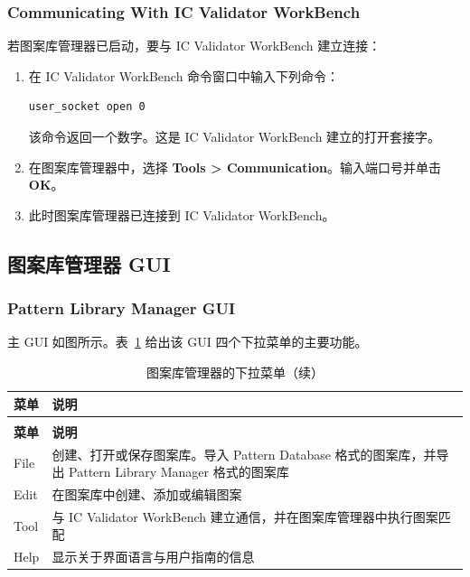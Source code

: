 \subsubsection*{Communicating With IC Validator WorkBench}

若图案库管理器已启动，要与 IC Validator WorkBench 建立连接：

\begin{enumerate}
  \item 在 IC Validator WorkBench 命令窗口中输入下列命令：
\begin{lstlisting}[style=shell]
user_socket open 0
\end{lstlisting}

  该命令返回一个数字。这是 IC Validator WorkBench 建立的打开套接字。


  \item 在图案库管理器中，选择 \textbf{Tools > Communication}。输入端口号并单击 \textbf{OK}。


  \item 此时图案库管理器已连接到 IC Validator WorkBench。
\end{enumerate}

\subsection{图案库管理器 GUI}
\subsubsection*{Pattern Library Manager GUI}

主 GUI 如图所示。表~\ref{tab:plm-menus} 给出该 GUI 四个下拉菜单的主要功能。

\begin{longtable}{@{}p{} p{}@{}}
\caption{图案库管理器的下拉菜单}\label{tab:plm-menus}\\
\toprule
\textbf{菜单} & \textbf{说明} \\
\midrule
\endfirsthead
\caption[]{图案库管理器的下拉菜单（续）}\\
\toprule
\textbf{菜单} & \textbf{说明} \\
\midrule
\endhead
\bottomrule
\endfoot
File
  & 创建、打开或保存图案库。导入 Pattern Database 格式的图案库，并导出 Pattern Library Manager 格式的图案库 \\
Edit
  & 在图案库中创建、添加或编辑图案 \\
Tool
  & 与 IC Validator WorkBench 建立通信，并在图案库管理器中执行图案匹配 \\
Help
  & 显示关于界面语言与用户指南的信息 \\
\end{longtable}

